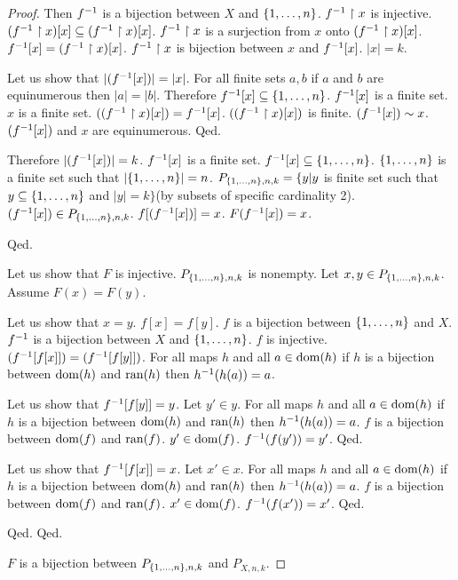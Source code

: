 \documentclass{article}
\begin{document}
\begin{forthel}
\begin{proof}
Then $f^{-1}$ is a bijection between $X$ and $\{1,\dots,n\}$.
$f^{-1} \upharpoonright x$ is injective.
$(f^{-1} \upharpoonright x)[x]  \subseteq (f^{-1} \upharpoonright x)[x]$.
$f^{-1} \upharpoonright x$ is a surjection from $x$ onto $(f^{-1} \upharpoonright x)[x]$.
$f^{-1}[x] = (f^{-1} \upharpoonright x)[x]$.
$f^{-1} \upharpoonright x$ is bijection between $x$ and $f^{-1}[x]$.
$|x| = k$.

Let us show that $|(f^{-1}[x])| = |x|$.
For all finite sets $a,b$ if $a$ and $b$ are equinumerous then $|a|=|b|$.
Therefore $f^{-1}[x] \subseteq \{1,\dots,n\}$.
$f^{-1}[x]$ is a finite set.
$x$ is a finite set.
$((f^{-1} \upharpoonright x)[x]) = f^{-1}[x]$.
$((f^{-1} \upharpoonright x)[x])$ is finite.
$(f^{-1}[x]) \sim x$.
$(f^{-1}[x])$ and $x$ are equinumerous.
Qed.

Therefore $|(f^{-1}[x])|=k$.
$f^{-1}[x]$ is a finite set.
$f^{-1}[x] \subseteq \{1,\dots,n\}$.
$\{1,\dots,n\}$ is a finite set such that $|\{1,\dots,n\}|=n$.
$P_{\{1,\dots,n\},n,k} = \{y|y$ is finite set such that $y \subseteq \{1,\dots,n\}$ and $|y| = k\}$(by subsets of specific cardinality 2).
$(f^{-1}[x]) \in P_{\{1,\dots,n\},n,k}$.
$f[(f^{-1}[x])] = x$.
$F(f^{-1}[x]) = x$.

Qed.

Let us show that $F$ is injective.
$P_{\{1,\dots,n\},n,k}$ is nonempty.
Let $x,y \in P_{\{1,\dots,n\},n,k}$.
Assume $F(x) = F(y)$.

Let us show that $x = y$.
$f[x] = f[y]$.
$f$ is a bijection between $\{1,\dots,n\}$ and $X$.
$f^{-1}$  is a bijection between $X$ and $\{1,\dots,n\}$.
$f$ is injective.
$(f^{-1}[f[x]]) = (f^{-1}[f[y]])$.
For all maps $h$ and all $a\in\operatorname{dom}(h)$ if $h$ is a bijection between $\operatorname{dom}(h)$ and $\operatorname{ran}(h)$ then $h^{-1}(h(a))=a$.

Let us show that $f^{-1}[f[y]]=y$.
Let $y' \in y$.
For all maps $h$ and all $a\in\operatorname{dom}(h)$ if $h$ is a bijection between $\operatorname{dom}(h)$ and $\operatorname{ran}(h)$ then $h^{-1}(h(a))=a$.
$f$ is a bijection between $\operatorname{dom}(f)$ and $\operatorname{ran}(f)$.
$y' \in \operatorname{dom}(f)$.
$f^{-1}(f(y')) = y'$.
Qed.

Let us show that $f^{-1}[f[x]]=x$.
Let $x' \in x$.
For all maps $h$ and all $a\in\operatorname{dom}(h)$ if $h$ is a bijection between $\operatorname{dom}(h)$ and $\operatorname{ran}(h)$ then $h^{-1}(h(a))=a$.
$f$ is a bijection between $\operatorname{dom}(f)$ and $\operatorname{ran}(f)$.
$x' \in \operatorname{dom}(f)$.
$f^{-1}(f(x')) = x'$.
Qed.

Qed.
Qed.

$F$ is a bijection between $P_{\{1,\dots,n\},n,k}$ and $P_{X,n,k}$.


\end{proof}
\end{forthel}
\end{document}
